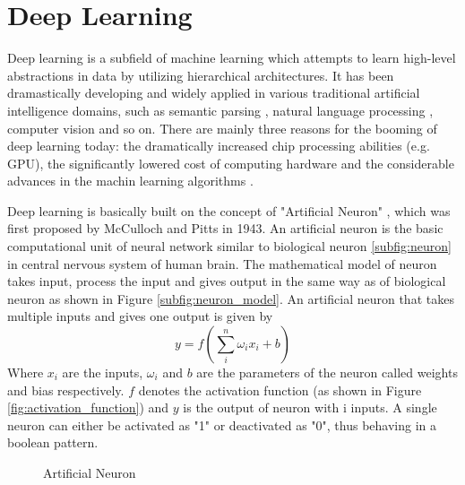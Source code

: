 \section{Deep Learning}
Deep learning is a subfield of machine learning which attempts to learn high-level abstractions in data by utilizing hierarchical architectures. It has been dramastically developing and widely applied in various traditional artificial intelligence domains, such as semantic parsing \cite{pmlr-v22-bordes12}, natural language processing \cite{DBLP:journals/corr/MikolovSCCD13}, computer vision \cite{DBLP:journals/corr/abs-1202-2745, krizhevsky2012} and so on. There are mainly three reasons for the booming of deep learning today: the dramatically increased chip processing abilities (e.g. GPU), the significantly lowered cost of computing hardware and the considerable advances in the machin learning algorithms \cite{deng_2014}.

Deep learning is basically built on the concept of "Artificial Neuron" \cite{McCulloch1943}, which was first proposed by McCulloch and Pitts in 1943. An artificial neuron is the basic computational unit of neural network similar to biological neuron \ref{subfig:neuron} in central nervous system of human brain. The mathematical model of neuron takes input, process the input and gives output in the same way as of biological neuron as shown in Figure \ref{subfig:neuron_model}. An artificial neuron that takes multiple inputs and gives one output is given by
\begin{equation}
y = f(\sum_{i}^{n} \omega_{i}x_{i} + b)
\end{equation}
Where $x_{i}$ are the inputs, $\omega_{i}$ and $b$ are the parameters of the neuron called weights and
bias respectively. $f$ denotes the activation function (as shown in Figure  \ref{fig:activation_function}) and $y$ is the output of neuron with i inputs. A single neuron can either be activated as "1" or deactivated as "0", thus behaving in a boolean pattern.

\begin{figure}[h!]
  \centering  
  \hspace{4em} %
  \caption{Artificial Neuron \cite{cnnlecture2017}}
\end{figure}

